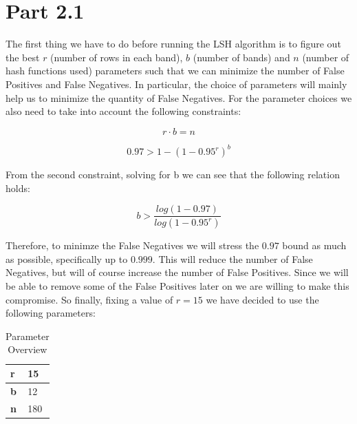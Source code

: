 \documentclass[12pt]{article}
\begin{document}
\section{Part 2.1}

The first thing we have to do before running the LSH algorithm is to figure out the best $r$ (number of rows in each band), $b$ (number of bands) and $n$ (number of hash functions used) parameters such that we can minimize the number of False Positives and False Negatives. In particular, the choice of parameters will mainly help us to minimize the quantity of False Negatives. For the parameter choices we also need to take into account the following constraints:

\begin{equation}
r \cdot b = n
\end{equation}


\begin{equation}
0.97 > 1 - (1-0.95^r)^b
\end{equation}

From the second constraint, solving for b we can see that the following relation holds:

\begin{equation}
b > \frac{log(1-0.97)}{log(1-0.95^r)}
\end{equation}

Therefore, to minimze the False Negatives we will stress the $0.97$ bound as much as possible, specifically up to $0.999$. This will reduce the number of False Negatives, but will of course increase the number of False Positives. Since we will be able to remove some of the False Positives later on we are willing to make this compromise. So finally, fixing a value of $r=15$ we have decided to use the following parameters:

\begin{table}[H]
\centering
\begin{tabular}{|l|l|}
\hline
\textbf{r} & 15    \\ \hline
\textbf{b} & 12   \\ \hline
\textbf{n} & 180 \\ \hline
\end{tabular}
\caption{Parameter Overview}
\label{tab:my-table}
\end{table}
\end{document}
